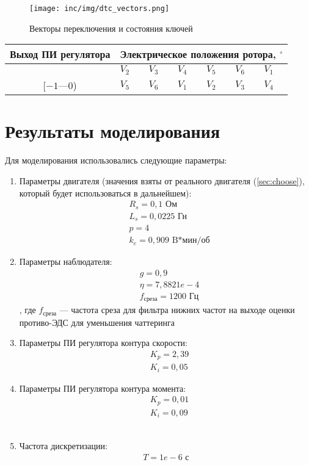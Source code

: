 \begin{figure}[!h]
\centering
\texttt{[image: inc/img/dtc\_vectors.png]}
\caption{Векторы переключения и состояния ключей \cite{art:dtc_smo}}
\label{pic:vectors_dtc}
\end{figure}

\begin{center}
\begin{tabular}{|c|p{1.5cm}|p{1.5cm}|p{1.5cm}|p{1.5cm}|p{1.5cm}|p{1.5cm}|}
 \hline
 Выход ПИ регулятора & \multicolumn{6}{c|}{Электрическое положения ротора, $^\circ$} \\
 \hline
 [$0$---$1$] & $V_2$ & $V_3$ & $V_4$ & $V_5$ & $V_6$ & $V_1$ \\ 
 \hline
 [$-1$---$0$) & $V_5$ & $V_6$ & $V_1$ & $V_2$ & $V_3$ & $V_4$ \\
 \hline
\end{tabular}
\end{center}

\section{Результаты моделирования}
\label{sec:model_res}

Для моделирования использовались следующие параметры:
\begin{enumerate}
	\item Параметры двигателя (значения взяты от реального двигателя (\ref{sec:choose}), который будет использоваться в дальнейшем):
	\begin{align*}
		&R_s = 0,1\textrm{ Ом}\\
		&L_s = 0,0225\textrm{ Гн}\\
		&p = 4\\
		&k_e = 0,909\textrm{ B*мин/об}
	\end{align*}
	\item Параметры наблюдателя:
	\begin{align*}
		&g = 0,9\\
		&\eta = 7,8821e-4\\
		&f_{\textrm{среза}}=1200\textrm{ Гц}
	\end{align*}, где $f_{\textrm{среза}}$ --- частота среза для фильтра нижних частот на выходе оценки противо-ЭДС для уменьшения чаттеринга
	\item Параметры ПИ регулятора контура скорости:
	\begin{align*}
		&K_p = 2,39\\
		&K_i = 0,05
	\end{align*}
	\item Параметры ПИ регулятора контура момента:
	\begin{align*}
		&K_p = 0,01\\
		&K_i = 0,09
	\end{align*}\
	\item Частота дискретизации:
	\begin{align*}
		T = 1e-6\textrm{ с}
	\end{align*}
\end{enumerate}

